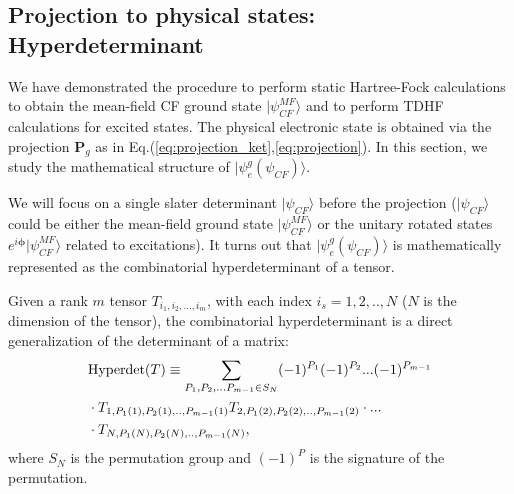 \subsection{Projection to physical states: Hyperdeterminant}\label{sec:proj}
We have demonstrated the procedure to perform static Hartree-Fock calculations to obtain the mean-field CF ground state $|\psi_{CF}^{MF}\rangle$ and to perform TDHF calculations for excited states. The physical electronic state is obtained via the projection $\mathbf P_g$ as in Eq.(\ref{eq:projection_ket},\ref{eq:projection}). In this section, we study the mathematical structure of $|\psi^g_e(\psi_{CF})\rangle$.

We will focus on a single slater determinant $|\psi_{CF}\rangle$ before the projection ($|\psi_{CF}\rangle$ could be either the mean-field ground state $|\psi_{CF}^{MF}\rangle$ or the unitary rotated states $e^{i\boldsymbol{\phi}}|\psi_{CF}^{MF}\rangle$ related to excitations). It turns out that $|\psi^g_e(\psi_{CF})\rangle$ is mathematically represented as the combinatorial hyperdeterminant of a tensor. 

Given a rank $m$ tensor $T_{i_1,i_2,...,i_m}$, with each index $i_s = 1,2,..,N$ ($N$ is the dimension of the tensor), the combinatorial hyperdeterminant \cite{gelfand1994hyperdeterminants} is a direct generalization of the determinant of a matrix:
\begin{align}
&\text{Hyperdet}(T)\equiv \sum_{P_1,P_2,...P_{m-1}\in S_N} (-1)^{P_1}(-1)^{P_2}...(-1)^{P_{m-1}} \notag\\
&\cdot T_{1,P_1(1),P_2(1),..,P_{m-1}(1)}T_{2,P_1(2),P_2(2),..,P_{m-1}(2)}\cdot ...\notag\\
&\cdot T_{N,P_1(N),P_2(N),..,P_{m-1}(N)},
\end{align}
where $S_N$ is the permutation group and $(-1)^P$ is the signature of the permutation.

